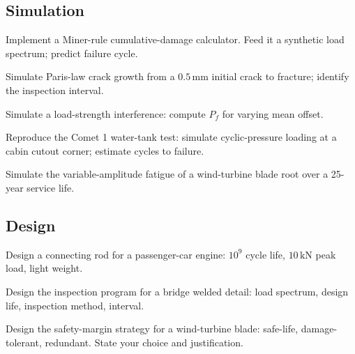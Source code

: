 \subsection*{Simulation}

\begin{exercise}
Implement a Miner-rule cumulative-damage calculator. Feed it a synthetic load spectrum; predict failure cycle.
\end{exercise}

\begin{exercise}
Simulate Paris-law crack growth from a $0.5\,\si{\milli\meter}$ initial crack to fracture; identify the inspection interval.
\end{exercise}

\begin{exercise}
Simulate a load-strength interference: compute $P_f$ for varying mean offset.
\end{exercise}

\begin{exercise}
Reproduce the Comet 1 water-tank test: simulate cyclic-pressure loading at a cabin cutout corner; estimate cycles to failure.
\end{exercise}

\begin{exercise}
Simulate the variable-amplitude fatigue of a wind-turbine blade root over a 25-year service life.
\end{exercise}

\subsection*{Design}

\begin{exercise}
Design a connecting rod for a passenger-car engine: $10^9$ cycle life, $10\,\si{\kilo\newton}$ peak load, light weight.
\end{exercise}

\begin{exercise}
Design the inspection program for a bridge welded detail: load spectrum, design life, inspection method, interval.
\end{exercise}

\begin{exercise}
Design the safety-margin strategy for a wind-turbine blade: safe-life, damage-tolerant, redundant. State your choice and justification.
\end{exercise}

